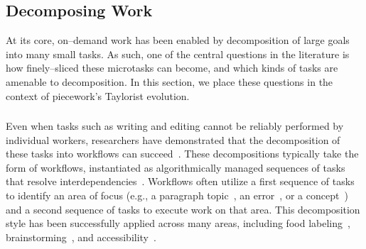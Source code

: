 \documentclass[pn4226]{subfiles}
\begin{document}
\subsection[How far can work be decomposed into smaller microtasks]{Decomposing Work}\label{sec:decomposition}

At its core,
on--demand work has been enabled by decomposition of large goals into many small tasks.
As such,
one of the central questions in the literature is how finely--sliced these microtasks can become, and which kinds of tasks are amenable to decomposition.
In this section,
we place these questions in the context of piecework's Taylorist evolution.

\begin{comment}
Outline:
Crowd work
	- How do we take work and split it up into smaller work?
	- How small can we go?
	- Once we split up, what happens? Marketplace choosing
Piecework
	- How do we take work and split it up?
	[ - how small can we go? ]
	[- Nothing about how people choose. ]
Same/different
	[- task data science ]
	[- Cognitive barriers, task switching, etc, dominates]
	[ - Switching is different, marketplace model ]
\end{comment}

\subsubsection{\crowdworkpers}
Even when tasks such as writing and editing cannot be reliably performed by individual workers,
researchers have demonstrated that
the decomposition of these tasks into workflows can succeed~\cite{crowdForgeKittur,
bernsteinSoylent,
writingMicroTasks,
Nebeling:2016:WCW:2858036.2858169}. 
These decompositions typically take the form of workflows,
instantiated as algorithmically managed sequences of tasks that resolve interdependencies~\cite{Bigham2014}. 
Workflows often utilize a first sequence of tasks to identify an area of focus (e.g.,
a paragraph topic~\cite{crowdForgeKittur},
an error~\cite{bernsteinSoylent},
or a concept~\cite{Yu2016a,Yu2016b}) and a second sequence of tasks to execute work on that area. 
This decomposition style has been successfully applied across many areas,
including food labeling~\cite{noronha2011platemate},
brainstorming~\cite{siangliulue2015toward,yu2014distributed},
and accessibility~\cite{lasecki2013chorus,lasecki2012real,Lasecki2011}.
\end{document}
